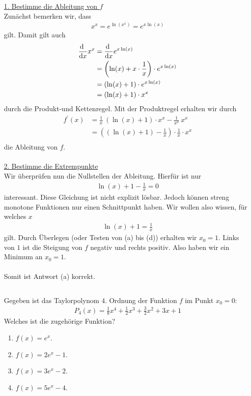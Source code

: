 \underline{1. Bestimme die Ableitung von $f$}\\
Zunächst bemerken wir, dass
\begin{align*}
x^x = e^{\ln(x^x)} = e^{x  \ln(x)}
\end{align*}
gilt. Damit gilt auch
\begin{align*}
\frac{\text{\rmfamily d}  \ }{\text{\rmfamily d} x} x^x
&= \frac{\text{\rmfamily d}  \ }{\text{\rmfamily d} x} e^{x \ln(x)}\\
&=\left(\ln(x) + x \cdot \frac{1}{x}\right)\cdot e^{x\ln(x)}\\
&= ( \ln(x) + 1) \cdot e^{x  \ln(x)}\\
&= ( \ln(x) + 1) \cdot x^x
\end{align*}
durch die Produkt-und Kettenregel.
Mit der Produktregel erhalten wir durch
\begin{align*}
f^\prime(x) &= \frac{1}{x} \ ( \ln(x) + 1) \cdot x^x
- \frac{1}{x^2} \ x^x\\
&= \left(  ( \ln(x) + 1) - \frac{1}{x} \right) \cdot  \frac{1}{x}\cdot x^x\\
\end{align*}
die Ableitung von $f$.\\
\\
\underline{2. Bestimme die Extrempunkte}\\
Wir überprüfen nun die Nullstellen der Ableitung.
Hierfür ist nur
\begin{align*}
\ln(x) + 1 - \frac{1}{x} = 0
\end{align*}
interessant.
Diese Gleichung ist nicht explizit lösbar.
Jedoch können streng monotone Funktionen nur einen Schnittpunkt haben.
Wir wollen also wissen, für welches $x$
\begin{align*}
\ln(x) + 1 = \frac{1}{x}
\end{align*}
gilt.
Durch Überlegen (oder Testen von (a) bis (d)) erhalten wir $x_0 =1$.
Links von $1$ ist die Steigung von $f$ negativ und rechts positiv.
Also haben wir ein Minimum an $x_0 = 1$.\\
\\
Somit ist Antwort (a) korrekt.

\newpage

\subsection*{}
Gegeben ist das Taylorpolynom $4.$ Ordnung der Funktion $f$ im Punkt $x_0 = 0$:
\begin{align*}
P_4(x) = \frac{1}{8}x^4 + \frac{1}{2} x^3 + \frac{3}{2} x^2 + 3x +1
\end{align*}
Welches ist die zugehörige Funktion?
\renewcommand{\labelenumi}{(\alph{enumi})}
\begin{enumerate}
\item $f(x) = e^x$.
\item $f(x) = 2  e^x - 1$.
\item $f(x) = 3  e^x - 2$.
\item $f(x) = 5  e^x - 4$.
\end{enumerate}

